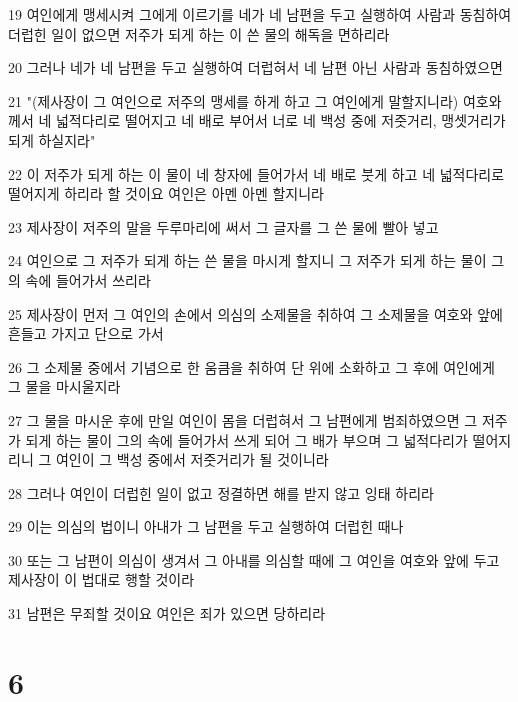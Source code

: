 \par 19 여인에게 맹세시켜 그에게 이르기를 네가 네 남편을 두고 실행하여 사람과 동침하여 더럽힌 일이 없으면 저주가 되게 하는 이 쓴 물의 해독을 면하리라
\par 20 그러나 네가 네 남편을 두고 실행하여 더럽혀서 네 남편 아닌 사람과 동침하였으면
\par 21 "(제사장이 그 여인으로 저주의 맹세를 하게 하고 그 여인에게 말할지니라) 여호와께서 네 넓적다리로 떨어지고 네 배로 부어서 너로 네 백성 중에 저줏거리, 맹셋거리가 되게 하실지라"
\par 22 이 저주가 되게 하는 이 물이 네 창자에 들어가서 네 배로 붓게 하고 네 넓적다리로 떨어지게 하리라 할 것이요 여인은 아멘 아멘 할지니라
\par 23 제사장이 저주의 말을 두루마리에 써서 그 글자를 그 쓴 물에 빨아 넣고
\par 24 여인으로 그 저주가 되게 하는 쓴 물을 마시게 할지니 그 저주가 되게 하는 물이 그의 속에 들어가서 쓰리라
\par 25 제사장이 먼저 그 여인의 손에서 의심의 소제물을 취하여 그 소제물을 여호와 앞에 흔들고 가지고 단으로 가서
\par 26 그 소제물 중에서 기념으로 한 움큼을 취하여 단 위에 소화하고 그 후에 여인에게 그 물을 마시울지라
\par 27 그 물을 마시운 후에 만일 여인이 몸을 더럽혀서 그 남편에게 범죄하였으면 그 저주가 되게 하는 물이 그의 속에 들어가서 쓰게 되어 그 배가 부으며 그 넓적다리가 떨어지리니 그 여인이 그 백성 중에서 저줏거리가 될 것이니라
\par 28 그러나 여인이 더럽힌 일이 없고 정결하면 해를 받지 않고 잉태 하리라
\par 29 이는 의심의 법이니 아내가 그 남편을 두고 실행하여 더럽힌 때나
\par 30 또는 그 남편이 의심이 생겨서 그 아내를 의심할 때에 그 여인을 여호와 앞에 두고 제사장이 이 법대로 행할 것이라
\par 31 남편은 무죄할 것이요 여인은 죄가 있으면 당하리라

\chapter{6}

